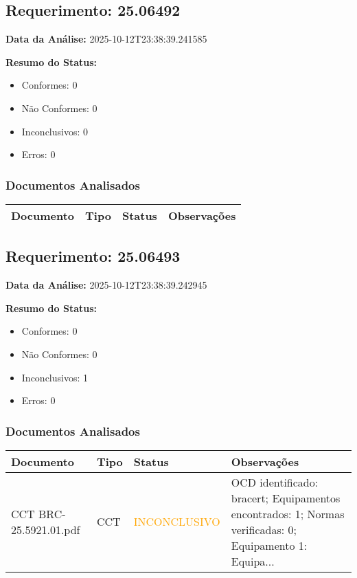 \documentclass[12pt,a4paper]{article}
\begin{document}
\subsection{Requerimento: 25.06492}

\textbf{Data da Análise:} 2025-10-12T23:38:39.241585

\textbf{Resumo do Status:}
\begin{itemize}
    \item Conformes: 0
    \item Não Conformes: 0
    \item Inconclusivos: 0
    \item Erros: 0
\end{itemize}

\subsubsection{Documentos Analisados}

\begin{longtable}{|p{4cm}|p{2cm}|p{2cm}|p{6cm}|}
\hline
\textbf{Documento} & \textbf{Tipo} & \textbf{Status} & \textbf{Observações} \\
\hline
\endhead
\end{longtable}


\subsection{Requerimento: 25.06493}

\textbf{Data da Análise:} 2025-10-12T23:38:39.242945

\textbf{Resumo do Status:}
\begin{itemize}
    \item Conformes: 0
    \item Não Conformes: 0
    \item Inconclusivos: 1
    \item Erros: 0
\end{itemize}

\subsubsection{Documentos Analisados}

\begin{longtable}{|p{4cm}|p{2cm}|p{2cm}|p{6cm}|}
\hline
\textbf{Documento} & \textbf{Tipo} & \textbf{Status} & \textbf{Observações} \\
\hline
\endhead
CCT BRC-25.5921.01.pdf & CCT & \textcolor{orange}{INCONCLUSIVO} & OCD identificado: bracert; Equipamentos encontrados: 1; Normas verificadas: 0; Equipamento 1: Equipa... \\
\hline
\end{longtable}
\end{document}
